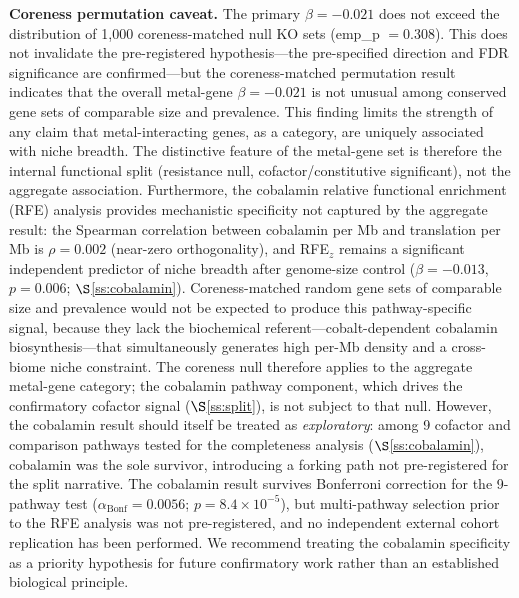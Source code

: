 \documentclass[times]{zHenriquesLab-StyleBioRxiv}
\begin{document}
\textbf{Coreness permutation caveat.} The primary $\beta = -0.021$ does not
exceed the distribution of 1,000 coreness-matched null KO sets (emp\_p $=
0.308$). This does not invalidate the pre-registered hypothesis---the pre-specified direction and FDR
significance are confirmed---but the coreness-matched permutation result
indicates that the overall metal-gene $\beta = -0.021$ is not unusual among
conserved gene sets of comparable size and prevalence. This finding limits the
strength of any claim that metal-interacting genes, as a category, are uniquely
associated with niche breadth. The distinctive feature of the metal-gene set
is therefore the internal functional split (resistance null, cofactor/constitutive
significant), not the aggregate association.
Furthermore, the cobalamin relative functional enrichment (RFE) analysis provides mechanistic specificity not captured by the aggregate result: the Spearman correlation between cobalamin per Mb and translation per Mb is $\rho = 0.002$ (near-zero orthogonality), and RFE$_z$ remains a significant independent predictor of niche breadth after genome-size control ($\beta = -0.013$, $p = 0.006$; $\S$\ref{ss:cobalamin}).
Coreness-matched random gene sets of comparable size and prevalence would not be expected to produce this pathway-specific signal, because they lack the biochemical referent---cobalt-dependent cobalamin biosynthesis---that simultaneously generates high per-Mb density and a cross-biome niche constraint.
The coreness null therefore applies to the aggregate metal-gene category; the cobalamin pathway component, which drives the confirmatory cofactor signal ($\S$\ref{ss:split}), is not subject to that null. However, the cobalamin result should itself be treated as \emph{exploratory}: among 9 cofactor and comparison pathways tested for the completeness analysis ($\S$\ref{ss:cobalamin}), cobalamin was the sole survivor, introducing a forking path not pre-registered for the split narrative. The cobalamin result survives Bonferroni correction for the 9-pathway test ($\alpha_\text{Bonf} = 0.0056$; $p = 8.4 \times 10^{-5}$), but multi-pathway selection prior to the RFE analysis was not pre-registered, and no independent external cohort replication has been performed. We recommend treating the cobalamin specificity as a priority hypothesis for future confirmatory work rather than an established biological principle.
\end{document}
